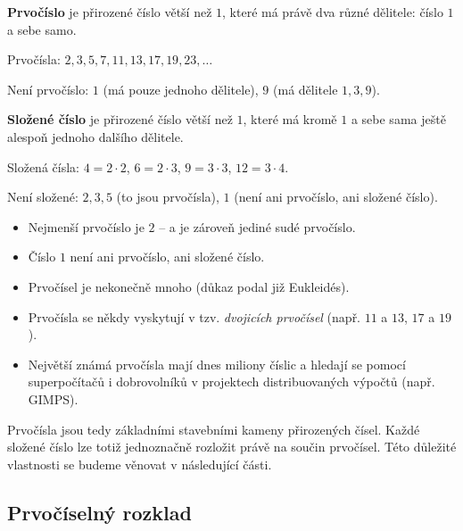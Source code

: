 \documentclass[12pt,a4paper]{article}
\begin{document}
\begin{definitionbox}
\textbf{Prvočíslo} je přirozené číslo větší než $1$, které má právě dva různé dělitele: číslo $1$ a sebe samo.
\end{definitionbox}

\begin{examplebox}
Prvočísla: $2, 3, 5, 7, 11, 13, 17, 19, 23, \dots$  

Není prvočíslo: $1$ (má pouze jednoho dělitele), $9$ (má dělitele $1, 3, 9$).
\end{examplebox}

\begin{definitionbox}
\textbf{Složené číslo} je přirozené číslo větší než $1$, které má kromě $1$ a sebe sama ještě alespoň jednoho dalšího dělitele.
\end{definitionbox}

\begin{examplebox}
Složená čísla: $4 = 2 \cdot 2$, $6 = 2 \cdot 3$, $9 = 3 \cdot 3$, $12 = 3 \cdot 4$.  

Není složené: $2, 3, 5$ (to jsou prvočísla), $1$ (není ani prvočíslo, ani složené číslo).
\end{examplebox}

\begin{notebox}
\begin{itemize}
    \item Nejmenší prvočíslo je $2$ – a je zároveň jediné sudé prvočíslo.  
    \item Číslo $1$ není ani prvočíslo, ani složené číslo.  
    \item Prvočísel je nekonečně mnoho (důkaz podal již Eukleidés).  
    \item Prvočísla se někdy vyskytují v tzv. \emph{dvojicích prvočísel} (např. $11$ a $13$, $17$ a $19$).  
    \item Největší známá prvočísla mají dnes miliony číslic a hledají se pomocí superpočítačů i dobrovolníků v projektech distribuovaných výpočtů (např. GIMPS).  
\end{itemize}
\end{notebox}

Prvočísla jsou tedy základními stavebními kameny přirozených čísel. Každé složené číslo lze totiž jednoznačně rozložit právě na součin prvočísel. Této důležité vlastnosti se budeme věnovat v následující části.

\subsection{Prvočíselný rozklad}
\end{document}
